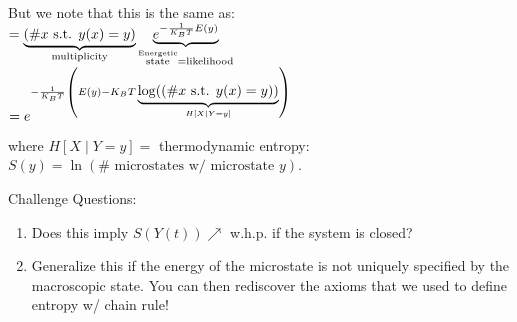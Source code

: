 But we note that this is the same as:\\
$=\underbrace{(\# x \text{ s.t. } y(x)=y)}_{\text{multiplicity}}\underbrace{e^{-\frac1{K_B T} E(y)}}_{\stackrel{\text{Energetic}}{\text{state}} = \text{likelihood}}$
\\
$=e^{-\frac1{K_B T} \left(E(y) - K_B T \underbrace{\log((\# x \text{ s.t. } y(x)=y))}_{H[X\mid Y=y]}\right)}$

where $H[X\mid Y=y]=$ thermodynamic entropy: $S(y)=\ln(\# \text{ microstates w/ microstate } y)$.

\begin{important}
    Challenge Questions:
    \begin{enumerate}
        \item Does this imply $S(Y(t))\nearrow$ w.h.p. if the system is closed?
        \item Generalize this if the energy of the microstate is not uniquely specified by the macroscopic state. You can then rediscover the axioms that we used to define entropy w/ chain rule!
    \end{enumerate}
\end{important}
